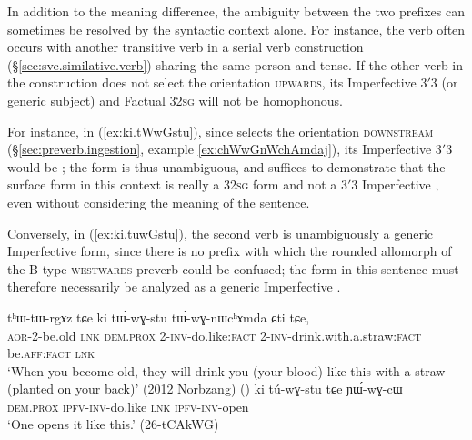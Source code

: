 In addition to the meaning difference, the ambiguity between the two prefixes can sometimes be resolved by the syntactic context alone. For instance, the verb  often occurs with another transitive verb in a serial verb construction (§\ref{sec:svc.similative.verb}) sharing the same person and tense. If the other verb in the construction does not select the orientation \textsc{upwards}, its Imperfective 3$'$\fl{}3 (or generic subject) and Factual 3\fl{}2\textsc{sg} will not be homophonous. 

For instance, in (\ref{ex:ki.tWwGstu}), since  selects the orientation \textsc{downstream} (§\ref{sec:preverb.ingestion}, example \ref{ex:chWwGnWchAmdaj}), its Imperfective 3$'$\fl{}3 would be ; the form  is thus unambiguous, and suffices to demonstrate that the surface form  in this context is really a 3\fl{}2\textsc{sg} form  and not a 3$'$\fl{}3 Imperfective , even without considering the meaning of the sentence.

Conversely, in (\ref{ex:ki.tuwGstu}), the second verb  is unambiguously a generic Imperfective form, since there is no prefix with which the rounded allomorph of the B-type \textsc{westwards} preverb  could be confused; the form  in this sentence must therefore necessarily be analyzed as a generic Imperfective .

\begin{exe}
	\ex   \label{ex:tuwGstu.ambiguity}
	\begin{xlist}
		\ex   \label{ex:ki.tWwGstu}
		\gll tʰɯ-tɯ-rgɤz tɕe ki tɯ́-wɣ-stu tɯ́-wɣ-nɯcʰɤmda ɕti tɕe, \\
		\textsc{aor}-2-be.old \textsc{lnk} \textsc{dem}.\textsc{prox} 2-\textsc{inv}-do.like:\textsc{fact} 2-\textsc{inv}-drink.with.a.straw:\textsc{fact} be.\textsc{aff}:\textsc{fact} \textsc{lnk} \\
		\glt `When you become old, they will drink you (your blood) like this with a straw (planted on your back)' (2012 Norbzang) 
()
		\ex   \label{ex:ki.tuwGstu}
		\gll ki tú-wɣ-stu tɕe ɲɯ́-wɣ-cɯ  \\
		\textsc{dem}.\textsc{prox} \textsc{ipfv}-\textsc{inv}-do.like \textsc{lnk} \textsc{ipfv}-\textsc{inv}-open \\
		\glt `One opens it like this.' (26-tCAkWG)
	\end{xlist}
\end{exe}

